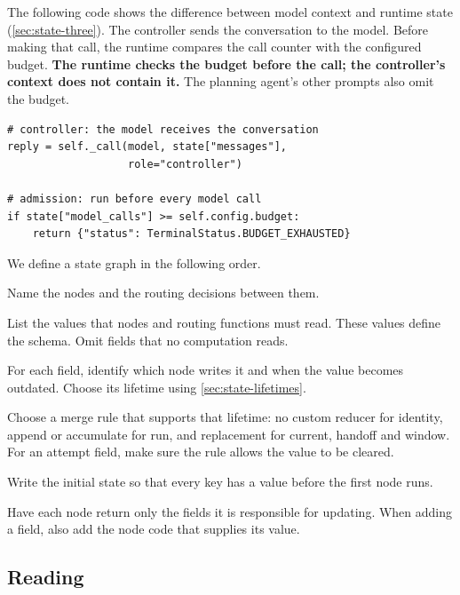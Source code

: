 The following code shows the difference between model context and runtime state
(\cref{sec:state-three}). The controller sends the conversation to the model. Before making
that call, the runtime compares the call counter with the configured budget.
\textbf{The runtime checks the budget before the call; the controller's context does not
contain it.} The planning agent's other prompts also omit the budget.

\noindent\begin{minipage}{\linewidth}
\begin{lstlisting}[basicstyle=\ttfamily\scriptsize]
# controller: the model receives the conversation
reply = self._call(model, state["messages"],
                   role="controller")

# admission: run before every model call
if state["model_calls"] >= self.config.budget:
    return {"status": TerminalStatus.BUDGET_EXHAUSTED}
\end{lstlisting}
\end{minipage}

We define a state graph in the following order.

\be

\item Name the nodes and the routing decisions between them.

\item List the values that nodes and routing functions must read. These values define the schema.
Omit fields that no computation reads.

\item For each field, identify which node writes it and when the value becomes outdated.
Choose its lifetime using \cref{sec:state-lifetimes}.

\item Choose a merge rule that supports that lifetime: no custom reducer for identity, append
or accumulate for run, and replacement for current, handoff and window. For an attempt field,
make sure the rule allows the value to be cleared.

\item Write the initial state so that every key has a value before the first node runs.

\item Have each node return only the fields it is responsible for updating. When adding a
field, also add the node code that supplies its value.

\ee

\subsection{Reading}

